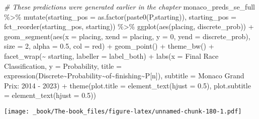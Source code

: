 \documentclass[
]{book}
\newenvironment{Shaded}{\begin{snugshade}}{\end{snugshade}}
\newcommand{\AttributeTok}[1]{\textcolor[rgb]{0.77,0.63,0.00}{#1}}
\newcommand{\CommentTok}[1]{\textcolor[rgb]{0.56,0.35,0.01}{\textit{#1}}}
\newcommand{\DecValTok}[1]{\textcolor[rgb]{0.00,0.00,0.81}{#1}}
\newcommand{\FloatTok}[1]{\textcolor[rgb]{0.00,0.00,0.81}{#1}}
\newcommand{\FunctionTok}[1]{\textcolor[rgb]{0.00,0.00,0.00}{#1}}
\newcommand{\NormalTok}[1]{#1}
\newcommand{\SpecialCharTok}[1]{\textcolor[rgb]{0.00,0.00,0.00}{#1}}
\newcommand{\StringTok}[1]{\textcolor[rgb]{0.31,0.60,0.02}{#1}}
\begin{document}
\begin{Shaded}
\begin{Highlighting}[]
\CommentTok{\# These predictions were generated earlier in the chapter}
\NormalTok{monaco\_preds\_se\_full }\SpecialCharTok{\%\textgreater{}\%}
  \FunctionTok{mutate}\NormalTok{(}\AttributeTok{starting\_pos =} \FunctionTok{as.factor}\NormalTok{(}\FunctionTok{paste0}\NormalTok{(}\StringTok{\textquotesingle{}P\textquotesingle{}}\NormalTok{,starting)),}
         \AttributeTok{starting\_pos =} \FunctionTok{fct\_reorder}\NormalTok{(starting\_pos, starting)) }\SpecialCharTok{\%\textgreater{}\%}
  \FunctionTok{ggplot}\NormalTok{(}\FunctionTok{aes}\NormalTok{(placing, discrete\_prob)) }\SpecialCharTok{+}
  \FunctionTok{geom\_segment}\NormalTok{(}\FunctionTok{aes}\NormalTok{(}\AttributeTok{x =}\NormalTok{ placing, }\AttributeTok{xend =}\NormalTok{ placing, }\AttributeTok{y =} \DecValTok{0}\NormalTok{, }\AttributeTok{yend =}\NormalTok{ discrete\_prob),}
               \AttributeTok{size =} \DecValTok{2}\NormalTok{, }\AttributeTok{alpha =} \FloatTok{0.5}\NormalTok{, }\AttributeTok{col =} \StringTok{\textquotesingle{}red\textquotesingle{}}\NormalTok{) }\SpecialCharTok{+}
  \FunctionTok{geom\_point}\NormalTok{() }\SpecialCharTok{+}
  \FunctionTok{theme\_bw}\NormalTok{() }\SpecialCharTok{+}
  \FunctionTok{facet\_wrap}\NormalTok{(}\SpecialCharTok{\textasciitilde{}}\NormalTok{ starting, }\AttributeTok{labeller =}\NormalTok{ label\_both) }\SpecialCharTok{+}
  \FunctionTok{labs}\NormalTok{(}\AttributeTok{x =} \StringTok{\textquotesingle{}Final Race Classification\textquotesingle{}}\NormalTok{,}
       \AttributeTok{y =} \StringTok{\textquotesingle{}Probability\textquotesingle{}}\NormalTok{,}
       \AttributeTok{title =} \FunctionTok{expression}\NormalTok{(Discrete}\SpecialCharTok{\textasciitilde{}}\NormalTok{Probability}\SpecialCharTok{\textasciitilde{}}\NormalTok{of}\SpecialCharTok{\textasciitilde{}}\NormalTok{finishing}\SpecialCharTok{\textasciitilde{}}\NormalTok{P[n]),}
       \AttributeTok{subtitle =} \StringTok{\textquotesingle{}Monaco Grand Prix: 2014 {-} 2023\textquotesingle{}}\NormalTok{) }\SpecialCharTok{+}
  \FunctionTok{theme}\NormalTok{(}\AttributeTok{plot.title =} \FunctionTok{element\_text}\NormalTok{(}\AttributeTok{hjust =} \FloatTok{0.5}\NormalTok{),}
        \AttributeTok{plot.subtitle =} \FunctionTok{element\_text}\NormalTok{(}\AttributeTok{hjust =} \FloatTok{0.5}\NormalTok{)) }
\end{Highlighting}
\end{Shaded}

\texttt{[image: \_book/The-book\_files/figure-latex/unnamed-chunk-180-1.pdf]}
\end{document}
